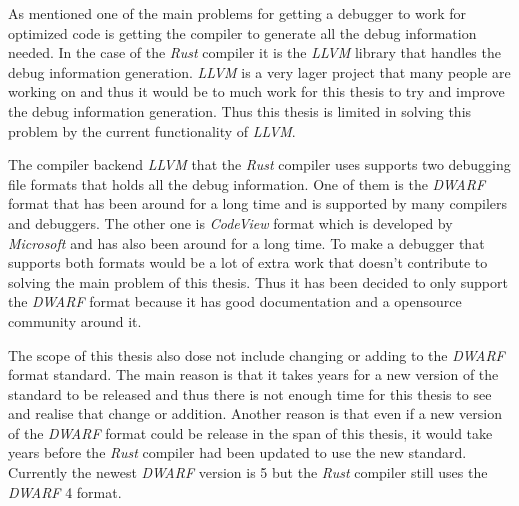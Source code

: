 




As mentioned one of the main problems for getting a debugger to work for optimized code is getting the compiler to generate all the debug information needed.
In the case of the \emph{Rust} compiler it is the \emph{LLVM} library that handles the debug information generation.
\emph{LLVM} is a very lager project that many people are working on and thus it would be to much work for this thesis to try and improve the debug information generation.
Thus this thesis is limited in solving this problem by the current functionality of \emph{LLVM}.


The compiler backend \emph{LLVM} that the \emph{Rust} compiler uses supports two debugging file formats that holds all the debug information.
One of them is the \emph{DWARF} format that has been around for a long time and is supported by many compilers and debuggers.
The other one is \emph{CodeView} format which is developed by \emph{Microsoft} and has also been around for a long time.
To make a debugger that supports both formats would be a lot of extra work that doesn't contribute to solving the main problem of this thesis.
Thus it has been decided to only support the \emph{DWARF} format because it has good documentation and a opensource community around it.


The scope of this thesis also dose not include changing or adding to the \emph{DWARF} format standard.
The main reason is that it takes years for a new version of the standard to be released and thus there is not enough time for this thesis to see and realise that change or addition.
Another reason is that even if a new version of the \emph{DWARF} format could be release in the span of this thesis, it would take years before the \emph{Rust} compiler had been updated to use the new standard.
Currently the newest \emph{DWARF} version is 5 but the \emph{Rust} compiler still uses the \emph{DWARF} 4 format.


